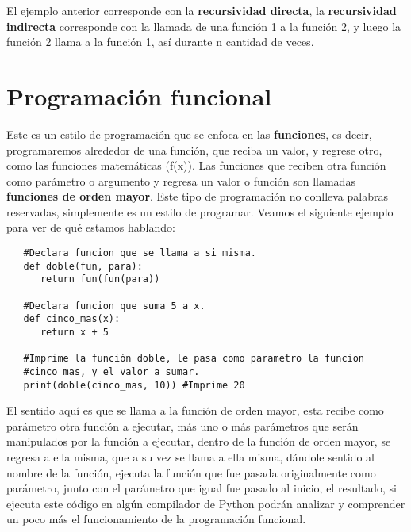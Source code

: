 El ejemplo anterior corresponde con la \textbf{recursividad directa}, la \textbf{recursividad indirecta} corresponde con la llamada de una función 1 a la función 2, y luego la función 2 llama a la función 1, así durante n cantidad de veces.



\section{Programación funcional}
\hspace{0.55cm}Este es un estilo de programación que se enfoca en las \textbf{funciones}, es decir, programaremos alrededor de una función, que reciba un valor, y regrese otro, como las funciones matemáticas (f(x)). Las funciones que reciben otra función como parámetro o argumento y regresa un valor o función son llamadas \textbf{funciones de orden mayor}. Este tipo de programación no conlleva palabras reservadas, simplemente es un estilo de programar. Veamos el siguiente ejemplo para ver de qué estamos hablando:
\begin{lstlisting}
   #Declara funcion que se llama a si misma.
   def doble(fun, para):
      return fun(fun(para))
      
   #Declara funcion que suma 5 a x.
   def cinco_mas(x):
      return x + 5
   
   #Imprime la función doble, le pasa como parametro la funcion
   #cinco_mas, y el valor a sumar.
   print(doble(cinco_mas, 10)) #Imprime 20
\end{lstlisting}

El sentido aquí es que se llama a la función de orden mayor, esta recibe como parámetro otra función a ejecutar, más uno o más parámetros que serán manipulados por la función a ejecutar, dentro de la función de orden mayor, se regresa a ella misma, que a su vez se llama a ella misma, dándole sentido al nombre de la función, ejecuta la función que fue pasada originalmente como parámetro, junto con el parámetro que igual fue pasado al inicio, el resultado, si ejecuta este código en algún compilador de Python podrán analizar y comprender un poco más el funcionamiento de la programación funcional.



